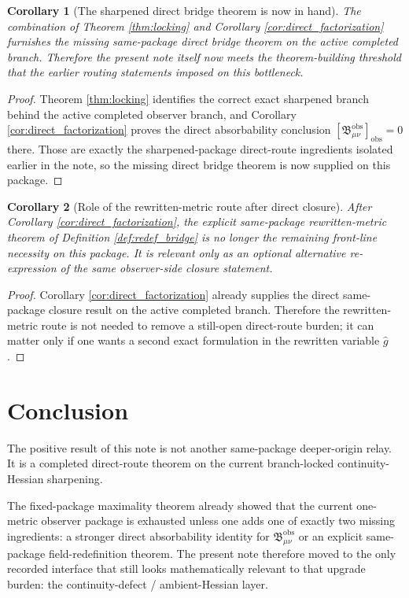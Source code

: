 \documentclass[11pt]{article}
\newcommand{\RedefMetric}{\widehat g}
\newcommand{\ObsBurden}{\mathfrak B_{\mu\nu}^{\mathrm{obs}}}
\newcommand{\ObserverClass}[1]{\left[#1\right]_{\mathrm{obs}}}
\newtheorem{corollary}{Corollary}
\begin{document}
\begin{corollary}[The sharpened direct bridge theorem is now in hand]
\label{cor:no_primary_yet}
The combination of Theorem \ref{thm:locking} and Corollary \ref{cor:direct_factorization} furnishes the missing same-package direct bridge theorem on the active completed branch. Therefore the present note itself now meets the theorem-building threshold that the earlier routing statements imposed on this bottleneck.
\end{corollary}

\begin{proof}
Theorem \ref{thm:locking} identifies the correct exact sharpened branch behind the active completed observer branch, and Corollary \ref{cor:direct_factorization} proves the direct absorbability conclusion \(\ObserverClass{\ObsBurden}=0\) there. Those are exactly the sharpened-package direct-route ingredients isolated earlier in the note, so the missing direct bridge theorem is now supplied on this package.
\end{proof}

\begin{corollary}[Role of the rewritten-metric route after direct closure]
\label{cor:immediate}
After Corollary \ref{cor:direct_factorization}, the explicit same-package rewritten-metric theorem of Definition \ref{def:redef_bridge} is no longer the remaining front-line necessity on this package. It is relevant only as an optional alternative re-expression of the same observer-side closure statement.
\end{corollary}

\begin{proof}
Corollary \ref{cor:direct_factorization} already supplies the direct same-package closure result on the active completed branch. Therefore the rewritten-metric route is not needed to remove a still-open direct-route burden; it can matter only if one wants a second exact formulation in the rewritten variable \(\RedefMetric\).
\end{proof}

\section{Conclusion}

The positive result of this note is not another same-package deeper-origin relay. It is a completed direct-route theorem on the current branch-locked continuity-Hessian sharpening.

The fixed-package maximality theorem already showed that the current one-metric observer package is exhausted unless one adds one of exactly two missing ingredients: a stronger direct absorbability identity for \(\ObsBurden\) or an explicit same-package field-redefinition theorem. The present note therefore moved to the only recorded interface that still looks mathematically relevant to that upgrade burden: the continuity-defect / ambient-Hessian layer.
\end{document}
